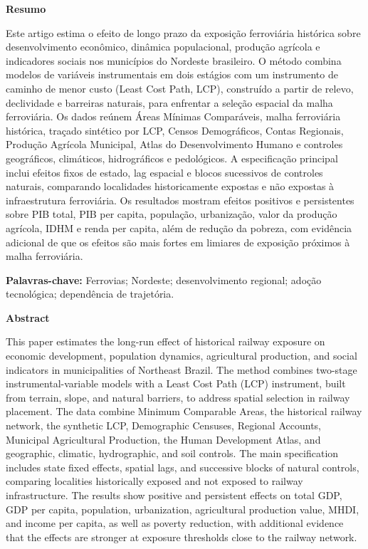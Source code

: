 \documentclass[12pt,a4paper]{article}
\newcommand{\palavraschave}{Ferrovias; Nordeste; desenvolvimento regional; adoção tecnológica; dependência de trajetória}
\begin{document}
\noindent\textbf{Resumo}\par
\noindent Este artigo estima o efeito de longo prazo da exposição ferroviária histórica sobre desenvolvimento econômico, dinâmica populacional, produção agrícola e indicadores sociais nos municípios do Nordeste brasileiro. O método combina modelos de variáveis instrumentais em dois estágios com um instrumento de caminho de menor custo (Least Cost Path, LCP), construído a partir de relevo, declividade e barreiras naturais, para enfrentar a seleção espacial da malha ferroviária. Os dados reúnem Áreas Mínimas Comparáveis, malha ferroviária histórica, traçado sintético por LCP, Censos Demográficos, Contas Regionais, Produção Agrícola Municipal, Atlas do Desenvolvimento Humano e controles geográficos, climáticos, hidrográficos e pedológicos. A especificação principal inclui efeitos fixos de estado, lag espacial e blocos sucessivos de controles naturais, comparando localidades historicamente expostas e não expostas à infraestrutura ferroviária. Os resultados mostram efeitos positivos e persistentes sobre PIB total, PIB per capita, população, urbanização, valor da produção agrícola, IDHM e renda per capita, além de redução da pobreza, com evidência adicional de que os efeitos são mais fortes em limiares de exposição próximos à malha ferroviária.

\vspace{0.3cm}
\noindent\textbf{Palavras-chave:} \palavraschave.

\vspace{0.5cm}
\noindent\textbf{Abstract}\par
\noindent This paper estimates the long-run effect of historical railway exposure on economic development, population dynamics, agricultural production, and social indicators in municipalities of Northeast Brazil. The method combines two-stage instrumental-variable models with a Least Cost Path (LCP) instrument, built from terrain, slope, and natural barriers, to address spatial selection in railway placement. The data combine Minimum Comparable Areas, the historical railway network, the synthetic LCP, Demographic Censuses, Regional Accounts, Municipal Agricultural Production, the Human Development Atlas, and geographic, climatic, hydrographic, and soil controls. The main specification includes state fixed effects, spatial lags, and successive blocks of natural controls, comparing localities historically exposed and not exposed to railway infrastructure. The results show positive and persistent effects on total GDP, GDP per capita, population, urbanization, agricultural production value, MHDI, and income per capita, as well as poverty reduction, with additional evidence that the effects are stronger at exposure thresholds close to the railway network.
\end{document}
